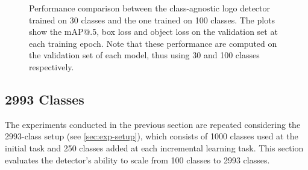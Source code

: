 \begin{figure}[H]
	\centering
    \qquad
    \caption{Performance comparison between the class-agnostic logo detector trained on 30 classes and the one trained on 100 classes. The plots show the mAP@.5, box loss and object loss on the validation set at each training epoch. Note that these performance are computed on the validation set of each model, thus using 30 and 100 classes respectively.}%
	\label{fig:exp-det_100}
\end{figure}


\subsection{2993 Classes}
\label{sec:2993-detector}
The experiments conducted in the previous section are repeated considering the 2993-class setup (see \autoref{sec:exp-setup}), which consists of 1000 classes used at the initial task and 250 classes added at each incremental learning task.
This section evaluates the detector's ability to scale from 100 classes to 2993 classes.


